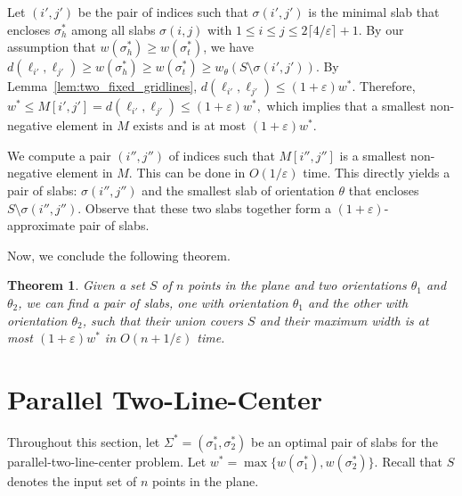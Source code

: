 \documentclass[10pt,a4paper]{article}
\newtheorem{theorem}{Theorem}
\theoremstyle{star}
\theoremstyle{claimstar}
\newcommand{\eps}{\ensuremath{\varepsilon}}
\begin{document}
Let $(i', j')$ be the pair of indices such that $\sigma(i', j')$ is the minimal slab that encloses $\sigma_h^*$ among all slabs $\sigma(i,j)$ with 
$1 \le i \le j \le 2\lceil 4/\eps \rceil + 1$.
By our assumption that $w(\sigma_h^*) \ge w(\sigma_t^*)$, we have 
$d(\ell_{i'}, \ell_{j'}) \ge w(\sigma_h^*) \ge w(\sigma_t^*)  \ge w_\theta(S \setminus \sigma(i', j'))$. 
By Lemma~\ref{lem:two_fixed_gridlines}, 
$d(\ell_{i'}, \ell_{j'}) \le (1+\eps)w^*$. 
Therefore,
$w^* \le M[i', j'] = d(\ell_{i'}, \ell_{j'}) \le (1+\eps)w^*,$
which implies that a smallest non-negative element in $M$ exists and is at most $(1+\eps)w^*$.

We compute a pair $(i'', j'')$ of indices such that $M[i'', j'']$ is a smallest non-negative element in $M$. This can be done in $O(1/\eps)$ time.
This directly yields a pair of slabs: $\sigma(i'', j'')$ and the smallest slab of orientation $\theta$ that encloses $S \setminus \sigma(i'', j'')$.  
Observe that these two slabs together form a $(1+\eps)$-approximate pair of slabs.

Now, we conclude the following theorem.

\begin{theorem}
    \label{thm:two_fixed_apx}
    Given a set $S$ of $n$ points in the plane and two orientations $\theta_1$ and $\theta_2$, 
    we can find a pair of slabs, one with orientation $\theta_1$ and the other with orientation $\theta_2$, such that their union covers $S$ and their maximum width is at most $(1+\eps)w^*$ in $O(n + 1/\eps)$ time.
\end{theorem}


\section{Parallel Two-Line-Center}
\label{sec:parallel}



Throughout this section, let $\Sigma^* = (\sigma_1^*, \sigma_2^* )$ be an optimal pair of slabs for the parallel-two-line-center problem.
Let $w^* = \max \{w(\sigma_1^*), w(\sigma_2^*) \}$.
Recall that $S$ denotes the input set of $n$ points in the plane. 
\end{document}
